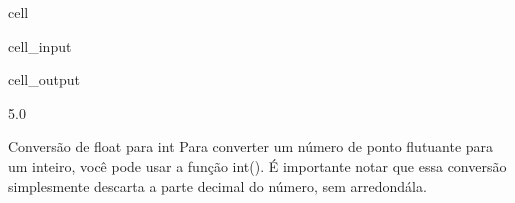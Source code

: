 \documentclass[letterpaper,10pt,english]{jupyterBook}
\begin{document}
\begin{sphinxuseclass}{cell}\begin{sphinxVerbatimInput}

\begin{sphinxuseclass}{cell_input}
\begin{sphinxVerbatim}[commandchars=\\\{\}]
  
  
\end{sphinxVerbatim}

\end{sphinxuseclass}\end{sphinxVerbatimInput}
\begin{sphinxVerbatimOutput}

\begin{sphinxuseclass}{cell_output}
\begin{sphinxVerbatim}[commandchars=\\\{\}]
5.0
\end{sphinxVerbatim}

\end{sphinxuseclass}\end{sphinxVerbatimOutput}

\end{sphinxuseclass}
\sphinxAtStartPar
Conversão de float para int
Para converter um número de ponto flutuante para um inteiro, você pode usar a função int(). É importante notar que essa conversão simplesmente descarta a parte decimal do número, sem arredondá\sphinxhyphen{}la.
\end{document}
